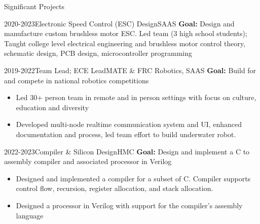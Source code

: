 \documentclass[]{mcdowellcv}
\begin{document}
\newpage

\begin{cvsection}{Significant Projects}
	\begin{cvsubsection}{2020-2023}{Electronic Speed Control (ESC) Design}{SAAS}
		\textbf{Goal:} Design and manufacture custom brushless motor ESC. Led team (3 high school students); Taught college level electrical engineering and brushless motor control theory, schematic design, PCB design, microcontroller programming
	\end{cvsubsection}
	\begin{cvsubsection}{2019-2022}{Team Lead; ECE Lead}{MATE \& FRC Robotics, SAAS}
		\textbf{Goal:} Build for and compete in national robotics competitions
		\begin{itemize}
			\item Led 30+ person team in remote and in person settings with focus on culture, education and diversity
			\item Developed multi-node realtime communication system and UI, enhanced documentation and process, led team effort to build underwater robot.
		\end{itemize}
	\end{cvsubsection}
	\begin{cvsubsection}{2022-2023}{Compiler \& Silicon Design}{HMC}
		\textbf{Goal:} Design and implement a C to assembly compiler and associated processor in Verilog
		\begin{itemize}
			\item Designed and implemented a compiler for a subset of C. Compiler supports control flow, recursion, register allocation, and stack allocation.
			\item Designed a processor in Verilog with support for the compiler's assembly language
		\end{itemize}
	\end{cvsubsection}
\end{cvsection}
\end{document}
